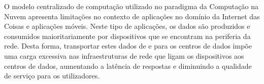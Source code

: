 


O modelo centralizado de computação utilizado no paradigma da Computação na Nuvem apresenta limitações no contexto de aplicações no domínio da Internet das Coisas e aplicações móveis. Neste tipo de aplicações, os dados são produzidos e consumidos maioritariamente por dispositivos que se encontram na periferia da rede. Desta forma, transportar estes dados de e para os centros de dados impõe uma carga excessiva nas infraestruturas de rede que ligam os dispositivos aos centros de dados, aumentando a latência de respostas e diminuindo a qualidade de serviço para os utilizadores. 

